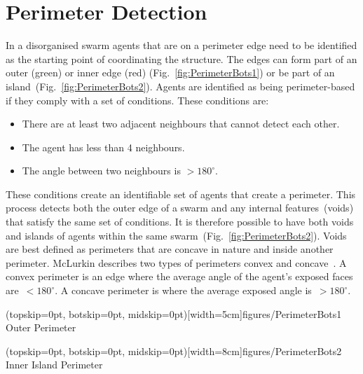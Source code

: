 \documentclass{ieeeaccess}
\begin{document}
\section{Perimeter Detection}\label{sec:PerimeterDetection}
In a disorganised swarm agents that are on a perimeter edge need to be identified as the starting point of coordinating the structure. The edges can form part of an outer (green) or inner edge (red) (Fig.~\ref{fig:PerimeterBots1}) or be part of an island~(Fig.~\ref{fig:PerimeterBots2}).
Agents are identified as being perimeter-based if they comply with a set of conditions. These conditions are: 
\begin{itemize}
  \item There are at least two adjacent neighbours that cannot detect each other.
  \item The agent has less than 4 neighbours.
  \item The angle between two neighbours is $> 180^\circ$.
\end{itemize} 

These conditions create an identifiable set of agents that create a perimeter.
This process detects both the outer edge of a swarm and any internal features~(voids) that satisfy the same set of conditions. It is therefore possible to have both voids and islands of agents within the same swarm~(Fig.~\ref{fig:PerimeterBots2}). Voids are best defined as perimeters that are concave in nature and inside another perimeter. McLurkin describes two types of perimeters convex and concave~\cite{MD:09}. A convex perimeter is an edge where the average angle of the agent's exposed faces are~$< 180^\circ$. A concave perimeter is where the average exposed angle is~$> 180^\circ$.

\Figure[t!](topskip=0pt, botskip=0pt, midskip=0pt)[width=5cm]{figures/PerimeterBots1}
{Outer Perimeter\label{fig:PerimeterBots1}}

\Figure[t!](topskip=0pt, botskip=0pt, midskip=0pt)[width=8cm]{figures/PerimeterBots2}
{Inner Island Perimeter\label{fig:PerimeterBots2}}
\end{document}
